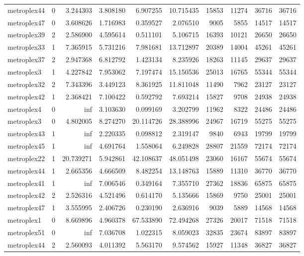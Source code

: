 \begin{longtable}{|l|r|r|r|r|r|r|r|r|r|}
metroplex44 & 0 & 3.244303 & 3.808180 & 6.907255 & 10.715435 & 15853 & 11274 & 36716 & 36716 \\
metroplex47 & 0 & 3.608626 & 1.716983 & 0.359527 & 2.076510 & 9005 & 5855 & 14517 & 14517 \\
metroplex39 & 2 & 2.586900 & 4.595614 & 0.511101 & 5.106715 & 16393 & 10121 & 26650 & 26650 \\
metroplex33 & 1 & 7.365915 & 5.731216 & 7.981681 & 13.712897 & 20389 & 14004 & 45261 & 45261 \\
metroplex37 & 2 & 2.947368 & 6.812792 & 1.423134 & 8.235926 & 18263 & 11145 & 29637 & 29637 \\
metroplex3 & 1 & 4.227842 & 7.953062 & 7.197474 & 15.150536 & 25013 & 16765 & 55344 & 55344 \\
metroplex32 & 2 & 7.343396 & 3.449123 & 8.361925 & 11.811048 & 11490 & 7962 & 23127 & 23127 \\
metroplex42 & 1 & 2.368421 & 7.100422 & 0.592792 & 7.693214 & 15827 & 9708 & 24938 & 24938 \\
metroplex4 & 0 & inf & 3.103630 & 0.099169 & 3.202799 & 11962 & 8322 & 24486 & 24486 \\
metroplex3 & 0 & 4.802005 & 8.274270 & 20.114726 & 28.388996 & 24967 & 16719 & 55275 & 55275 \\
metroplex43 & 1 & inf & 2.220335 & 0.098812 & 2.319147 & 9840 & 6943 & 19799 & 19799 \\
metroplex45 & 1 & inf & 4.691764 & 1.558064 & 6.249828 & 28807 & 21559 & 72174 & 72174 \\
metroplex22 & 1 & 20.739271 & 5.942861 & 42.108637 & 48.051498 & 23060 & 16167 & 55674 & 55674 \\
metroplex44 & 1 & 2.665356 & 4.666509 & 8.482254 & 13.148763 & 15889 & 11310 & 36770 & 36770 \\
metroplex41 & 1 & inf & 7.006546 & 0.349164 & 7.355710 & 27362 & 18836 & 65875 & 65875 \\
metroplex42 & 2 & 2.526316 & 4.521496 & 0.614170 & 5.135666 & 15869 & 9750 & 25001 & 25001 \\
metroplex47 & 1 & 3.555995 & 2.406726 & 0.230190 & 2.636916 & 9039 & 5889 & 14568 & 14568 \\
metroplex1 & 0 & 8.669896 & 4.960378 & 67.533890 & 72.494268 & 27326 & 20017 & 71518 & 71518 \\
metroplex51 & 0 & inf & 7.036708 & 1.022315 & 8.059023 & 32835 & 23674 & 83897 & 83897 \\
metroplex44 & 2 & 2.560093 & 4.011392 & 5.563170 & 9.574562 & 15927 & 11348 & 36827 & 36827 \\

\end{longtable}
